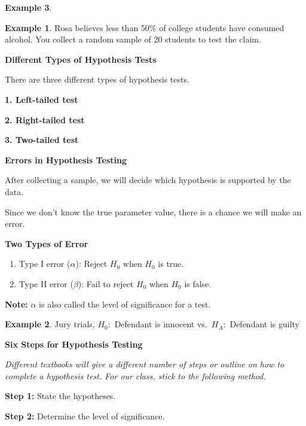 \documentclass[
  11pt,
  oneside]{book}
\providecommand{\tightlist}{%
  \setlength{\itemsep}{0pt}\setlength{\parskip}{0pt}}
\theoremstyle{definition}
\theoremstyle{definition}
\newtheorem{example}{Example}[chapter]
\theoremstyle{definition}
\theoremstyle{definition}
\theoremstyle{remark}
\begin{document}
\begin{example}
\vfill

\begin{example}
Rosa believes less than 50\% of college students have consumed alcohol. You collect a random sample of 20 students to test the claim.
\end{example}

\vfill

\newpage

\textbf{Different Types of Hypothesis Tests}

There are three different types of hypothesis tests.

\textbf{1. Left-tailed test} \vfill

\textbf{2. Right-tailed test} \vfill

\textbf{3. Two-tailed test} \vfill

\newpage

\textbf{Errors in Hypothesis Testing}

After collecting a sample, we will decide which hypothesis is supported by the data.

Since we don't know the true parameter value, there is a chance we will make an error.

\textbf{Two Types of Error}

\begin{enumerate}
\def\labelenumi{\arabic{enumi}.}
\tightlist
\item
  Type I error (\(\alpha\)): Reject \(H_0\) when \(H_0\) is true.
\item
  Type II error (\(\beta\)): Fail to reject \(H_0\) when \(H_0\) is false.
\end{enumerate}

\textbf{Note:} \(\alpha\) is also called the level of significance for a test.

\begin{example}
Jury trials, \(H_0:\) Defendant is innocent vs.~\(H_A:\) Defendant is guilty
\end{example}

\vfill

\newpage

\textbf{Six Steps for Hypothesis Testing}

\emph{Different textbooks will give a different number of steps or outline on how to complete a hypothesis test. For our class, stick to the following method.}

\textbf{Step 1:} State the hypotheses.
\vfill

\textbf{Step 2:} Determine the level of significance.
\vfill


\end{example}
\end{document}
